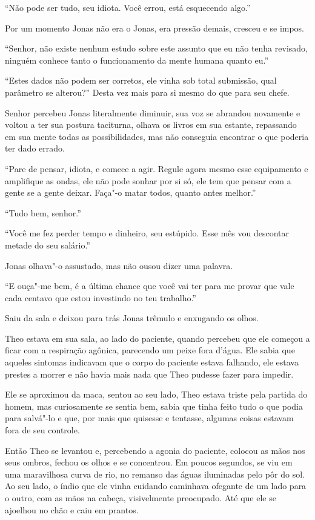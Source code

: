 ``Não pode ser tudo, seu idiota. Você errou, está esquecendo algo.''

Por um momento Jonas não era o Jonas, era pressão demais, cresceu e se
impos.

``Senhor, não existe nenhum estudo sobre este assunto que eu não tenha
revisado, ninguém conhece tanto o funcionamento da mente humana quanto
eu.''

``Estes dados não podem ser corretos, ele vinha sob total submissão, qual
parâmetro se alterou?'' Desta vez mais para si mesmo do que para seu
chefe.

Senhor  percebeu Jonas literalmente diminuir, sua voz se abrandou
novamente e voltou a ter sua postura taciturna, olhava os livros em sua
estante, repassando em sua mente todas as possibilidades, mas não
conseguia encontrar o que poderia ter dado errado.

``Pare de pensar, idiota, e comece a agir. Regule agora mesmo esse
equipamento e amplifique as ondas, ele não pode sonhar por si só, ele
tem que pensar com a gente se a gente deixar. Faça"-o matar todos, quanto
antes melhor.''

``Tudo bem, senhor.''

``Você me fez perder tempo e dinheiro, seu estúpido. Esse mês vou
descontar metade do seu salário.''

Jonas olhava"-o assustado, mas não ousou dizer uma palavra.

``E ouça"-me bem, é a última chance que você vai ter para me provar que
vale cada centavo que estou investindo no teu trabalho.''

Saiu da sala e deixou para trás Jonas trêmulo e enxugando os olhos.

\asterisc


Theo estava em sua sala, ao lado do paciente, quando percebeu que ele
começou a ficar com a respiração agônica, parecendo um peixe fora
d'água. Ele sabia que aqueles sintomas indicavam que o corpo do paciente
estava falhando, ele estava prestes a morrer e não havia mais nada que
Theo pudesse fazer para impedir.

Ele se aproximou da maca, sentou ao seu lado, Theo estava triste pela
partida do homem, mas curiosamente se sentia bem, sabia que tinha feito
tudo o que podia para salvá"-lo e que, por mais que quisesse e tentasse,
algumas coisas estavam fora de seu controle.

Então Theo se levantou e, percebendo a agonia do paciente, colocou as
mãos nos seus ombros, fechou os olhos e se concentrou. Em poucos
segundos, se viu em uma maravilhosa curva de rio, no remanso das águas
iluminadas pelo pôr do sol. Ao seu lado, o índio que ele vinha cuidando
caminhava ofegante de um lado para o outro, com as mãos na cabeça,
visivelmente preocupado. Até que ele se ajoelhou no chão e caiu em
prantos.

